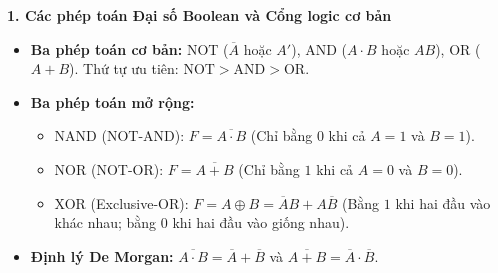 \textbf{1. Các phép toán Đại số Boolean và Cổng logic cơ bản}
\begin{itemize}
    \item \textbf{Ba phép toán cơ bản:} NOT ($\overline{A}$ hoặc $A'$), AND ($A \cdot B$ hoặc $AB$), OR ($A + B$). Thứ tự ưu tiên: $\text{NOT} > \text{AND} > \text{OR}$.
    \item \textbf{Ba phép toán mở rộng:}
    \begin{itemize}
        \item NAND (NOT-AND): $F = \overline{A \cdot B}$ (Chỉ bằng $0$ khi cả $A = 1$ và $B = 1$).
        \item NOR (NOT-OR): $F = \overline{A + B}$ (Chỉ bằng $1$ khi cả $A = 0$ và $B = 0$).
        \item XOR (Exclusive-OR): $F = A \oplus B = \overline{A}B + A\overline{B}$ (Bằng $1$ khi hai đầu vào khác nhau; bằng $0$ khi hai đầu vào giống nhau).
    \end{itemize}
    \item \textbf{Định lý De Morgan:} $\overline{A \cdot B} = \overline{A} + \overline{B}$ \quad và \quad $\overline{A + B} = \overline{A} \cdot \overline{B}$.
\end{itemize}

